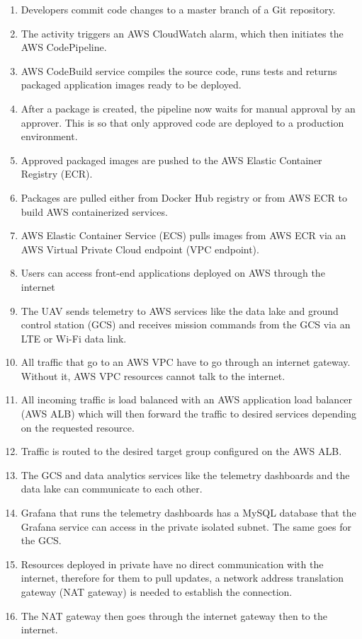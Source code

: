 \begin{enumerate}
    \item Developers commit code changes to a master branch of a Git repository.
    \item The activity triggers an AWS CloudWatch alarm, which then initiates the AWS CodePipeline.
    \item AWS CodeBuild service compiles the source code, runs tests and returns packaged application images ready to be deployed.
    \item After a package is created, the pipeline now waits for manual approval by an approver. This is so that only approved code are deployed to a production environment.
    \item Approved packaged images are pushed to the AWS Elastic Container Registry (ECR).
    \item Packages are pulled either from Docker Hub registry or from AWS ECR to build AWS containerized services.
    \item AWS Elastic Container Service (ECS) pulls images from AWS ECR via an AWS Virtual Private Cloud endpoint (VPC endpoint).
    \item Users can access front-end applications deployed on AWS through the internet
    \item The UAV sends telemetry to AWS services like the data lake and ground control station (GCS) and receives mission commands from the GCS via an LTE or Wi-Fi data link.
    \item All traffic that go to an AWS VPC have to go through an internet gateway. Without it, AWS VPC resources cannot talk to the internet.
    \item All incoming traffic is load balanced with an AWS application load balancer (AWS ALB) which will then forward the traffic to desired services depending on the requested resource.
    \item Traffic is routed to the desired target group configured on the AWS ALB.
    \item The GCS and data analytics services like the telemetry dashboards and the data lake can communicate to each other.
    \item Grafana that runs the telemetry dashboards has a MySQL database that the Grafana service can access in the private isolated subnet. The same goes for the GCS.
    \item Resources deployed in private have no direct communication with the internet, therefore for them to pull updates, a network address translation gateway (NAT gateway) is needed to establish the connection.
    \item The NAT gateway then goes through the internet gateway then to the internet.
\end{enumerate}

